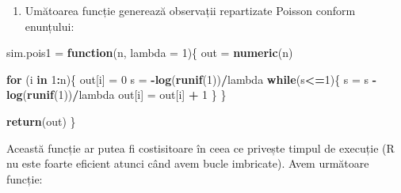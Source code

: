 \documentclass[]{article}
\newenvironment{Shaded}{\begin{snugshade}}{\end{snugshade}}
\newcommand{\KeywordTok}[1]{\textcolor[rgb]{0.13,0.29,0.53}{\textbf{#1}}}
\newcommand{\DataTypeTok}[1]{\textcolor[rgb]{0.13,0.29,0.53}{#1}}
\newcommand{\DecValTok}[1]{\textcolor[rgb]{0.00,0.00,0.81}{#1}}
\newcommand{\StringTok}[1]{\textcolor[rgb]{0.31,0.60,0.02}{#1}}
\newcommand{\ControlFlowTok}[1]{\textcolor[rgb]{0.13,0.29,0.53}{\textbf{#1}}}
\newcommand{\OperatorTok}[1]{\textcolor[rgb]{0.81,0.36,0.00}{\textbf{#1}}}
\newcommand{\NormalTok}[1]{#1}
\providecommand{\tightlist}{%
  \setlength{\itemsep}{0pt}\setlength{\parskip}{0pt}}
\begin{document}
\begin{enumerate}
\def\labelenumi{\arabic{enumi}.}
\setcounter{enumi}{2}
\tightlist
\item
  Umătoarea funcție generează observații repartizate Poisson conform
  enunțului:
\end{enumerate}

\begin{Shaded}
\begin{Highlighting}[]
\NormalTok{sim.pois1 =}\StringTok{ }\ControlFlowTok{function}\NormalTok{(n, }\DataTypeTok{lambda =} \DecValTok{1}\NormalTok{)\{}
\NormalTok{  out =}\StringTok{ }\KeywordTok{numeric}\NormalTok{(n)}
  
  \ControlFlowTok{for}\NormalTok{ (i }\ControlFlowTok{in} \DecValTok{1}\OperatorTok{:}\NormalTok{n)\{}
\NormalTok{    out[i] =}\StringTok{ }\DecValTok{0}
\NormalTok{    s =}\StringTok{ }\OperatorTok{-}\KeywordTok{log}\NormalTok{(}\KeywordTok{runif}\NormalTok{(}\DecValTok{1}\NormalTok{))}\OperatorTok{/}\NormalTok{lambda}
    \ControlFlowTok{while}\NormalTok{(s}\OperatorTok{<=}\DecValTok{1}\NormalTok{)\{}
\NormalTok{      s =}\StringTok{ }\NormalTok{s }\OperatorTok{-}\StringTok{ }\KeywordTok{log}\NormalTok{(}\KeywordTok{runif}\NormalTok{(}\DecValTok{1}\NormalTok{))}\OperatorTok{/}\NormalTok{lambda }
\NormalTok{      out[i] =}\StringTok{ }\NormalTok{out[i] }\OperatorTok{+}\StringTok{ }\DecValTok{1}
\NormalTok{    \}}
\NormalTok{  \}}
  
  \KeywordTok{return}\NormalTok{(out)}
\NormalTok{\}}
\end{Highlighting}
\end{Shaded}

Această funcție ar putea fi costisitoare în ceea ce privește timpul de
execuție (R nu este foarte eficient atunci când avem bucle imbricate).
Avem următoare funcție:
\end{document}
